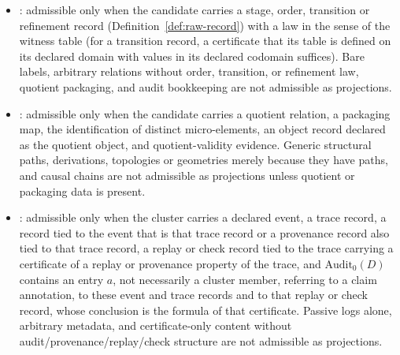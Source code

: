 \begin{proposition}
\begin{itemize}[topsep=2pt,itemsep=1pt]
  \item \Pfour{}: admissible only when the candidate carries a stage,
    order, transition or refinement record (Definition~\ref{def:raw-record})
    with a law in the sense of the witness table (for a transition record,
    a certificate that its table is defined on its declared domain with
    values in its declared codomain suffices). Bare labels, arbitrary
    relations without order, transition, or refinement law, quotient
    packaging, and audit bookkeeping are not admissible as \Pfour{}
    projections.
  \item \Pfive{}: admissible only when the candidate carries a quotient
    relation, a packaging map, the identification of distinct
    micro-elements, an object record declared as the quotient object, and
    quotient-validity evidence. Generic structural paths, derivations,
    topologies or geometries merely because they have paths, and causal
    chains are not admissible as \Pfive{} projections unless quotient
    or packaging data is present.
  \item \Psix{}: admissible only when the cluster carries a declared event,
    a trace record, a record tied to the event that is that trace record or a
    provenance record also tied to that trace record, a replay or check record tied to the trace carrying a certificate of a replay or provenance property of
    the trace, and \(\mathrm{Audit}_0(D)\) contains an entry \(a\), not necessarily a cluster member, referring to a claim
    annotation, to these event and trace records and to that replay or check
    record, whose conclusion is the formula of that certificate.
    Passive logs alone, arbitrary metadata, and certificate-only
    content without audit/provenance/replay/check structure are not
    admissible as \Psix{} projections.
\end{itemize}
\end{proposition}

